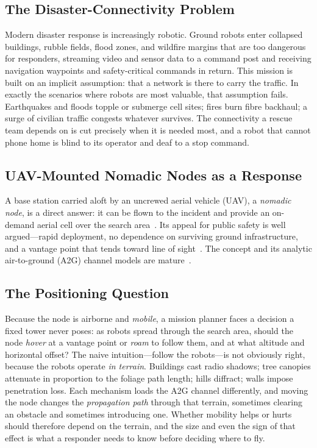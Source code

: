 \documentclass[conference]{IEEEtran}
\begin{document}
\subsection{The Disaster-Connectivity Problem}
Modern disaster response is increasingly robotic. Ground robots enter collapsed
buildings, rubble fields, flood zones, and wildfire margins that are too dangerous
for responders, streaming video and sensor data to a command post and receiving
navigation waypoints and safety-critical commands in return. This mission is built on
an implicit assumption: that a network is there to carry the traffic. In exactly the
scenarios where robots are most valuable, that assumption fails. Earthquakes and
floods topple or submerge cell sites; fires burn fibre backhaul; a surge of civilian
traffic congests whatever survives. The connectivity a rescue team depends on is cut
precisely when it is needed most, and a robot that cannot phone home is blind to its
operator and deaf to a stop command.

\subsection{UAV-Mounted Nomadic Nodes as a Response}
A base station carried aloft by an uncrewed aerial vehicle (UAV), a \emph{nomadic
node}, is a direct answer: it can be flown to the incident and provide an on-demand
aerial cell over the search area~\cite{zeng2016wireless, naqvi2018drone,
merwaday2016improved}. Its appeal for public safety is well argued---rapid
deployment, no dependence on surviving ground infrastructure, and a vantage point
that tends toward line of sight~\cite{mozaffari2019tutorial}. The concept and its
analytic air-to-ground (A2G) channel models are mature~\cite{alhourani2014optimal,
3gpp36777}.

\subsection{The Positioning Question}
Because the node is airborne and \emph{mobile}, a mission planner faces a decision a
fixed tower never poses: as robots spread through the search area, should the node
\emph{hover} at a vantage point or \emph{roam} to follow them, and at what altitude
and horizontal offset? The naive intuition---follow the robots---is not obviously
right, because the robots operate \emph{in terrain}. Buildings cast radio shadows;
tree canopies attenuate in proportion to the foliage path length; hills diffract;
walls impose penetration loss. Each mechanism loads the A2G channel differently, and
moving the node changes the \emph{propagation path} through that terrain, sometimes
clearing an obstacle and sometimes introducing one. Whether mobility helps or hurts
should therefore depend on the terrain, and the size and even the sign of that effect
is what a responder needs to know before deciding where to fly.
\end{document}
